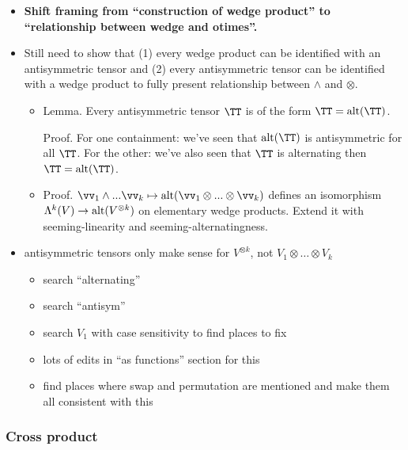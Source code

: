 \begin{itemize}
    \item \textbf{Shift framing from “construction of wedge product” to “relationship between wedge and otimes”.}
    \item Still need to show that (1) every wedge product can be identified with an antisymmetric tensor and (2) every antisymmetric tensor can be identified with a wedge product to fully present relationship between $\wedge$ and $\otimes$.
    \begin{itemize}
        \item Lemma. Every antisymmetric tensor $\TT$ is of the form $\TT = \alt(\TT)$.

        Proof. For one containment: we've seen that $\alt(\TT)$ is antisymmetric for all $\TT$. For the other: we've also seen that $\TT$ is alternating then $\TT = \alt(\TT)$.

        \item Proof. $\vv_1 \wedge ... \vv_k \mapsto \alt(\vv_1 \otimes ... \otimes \vv_k)$ defines an isomorphism $\Lambda^k(V) \rightarrow \text{alt}(V^{\otimes k})$ on elementary wedge products. Extend it with seeming-linearity and seeming-alternatingness. 
    \end{itemize}

    \item antisymmetric tensors only make sense for $V^{\otimes k}$, not $V_1 \otimes … \otimes V_k$
    \begin{itemize}
        \item search “alternating”
        \item search “antisym”
        \item search $V_1$ with case sensitivity to find places to fix
        \item lots of edits in “as functions” section for this
        \item find places where swap and permutation are mentioned and make them all consistent with this
    \end{itemize}
\end{itemize}

\subsubsection{Cross product}

